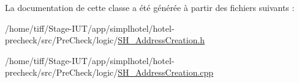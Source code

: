 La documentation de cette classe a été générée à partir des fichiers suivants \-:\begin{DoxyCompactItemize}
\item 
/home/tiff/\-Stage-\/\-I\-U\-T/app/simplhotel/hotel-\/precheck/src/\-Pre\-Check/logic/\hyperlink{SH__AddressCreation_8h}{S\-H\-\_\-\-Address\-Creation.\-h}\item 
/home/tiff/\-Stage-\/\-I\-U\-T/app/simplhotel/hotel-\/precheck/src/\-Pre\-Check/logic/\hyperlink{SH__AddressCreation_8cpp}{S\-H\-\_\-\-Address\-Creation.\-cpp}\end{DoxyCompactItemize}
